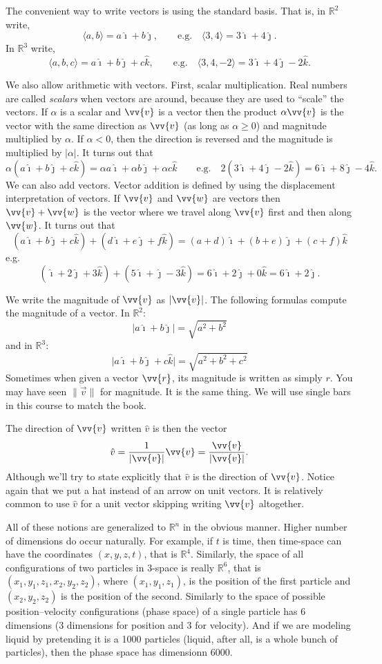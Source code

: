 \documentclass[11pt]{article}
\newcommand{\sabs}[1]{\lvert {#1} \rvert}
\newcommand{\snorm}[1]{\lVert {#1} \rVert}
\newcommand{\R}{{\mathbb{R}}}
\newcommand{\veci}{\hat{\imath}}
\newcommand{\vecj}{\hat{\jmath}}
\newcommand{\veck}{\hat{k}}
\begin{document}
The convenient way to write vectors is using the standard basis.
That is, in $\R^2$ write,
$$
\langle a,b \rangle = a \veci + b \vecj,
\qquad \text{e.g.} \quad
\langle 3,4 \rangle = 3 \veci + 4 \vecj.
$$
In $\R^3$ write,
$$
\langle a,b,c \rangle = a \veci + b \vecj + c \veck,
\qquad \text{e.g.} \quad
\langle 3,4,-2 \rangle = 3 \veci + 4 \vecj - 2 \veck.
$$

We also allow arithmetic with vectors.
First, scalar multiplication.
Real numbers are called \emph{scalars} when vectors are around,
because they are used to ``scale'' the vectors.
If $\alpha$ is a scalar and $\vv{v}$
is a vector then the product $\alpha\vv{v}$ is the vector with the same direction as
$\vv{v}$ (as long as $\alpha \geq 0$) and magnitude multiplied by $\alpha$.
If $\alpha < 0$, then the direction is reversed and the magnitude is multiplied by
$\sabs{\alpha}$.
It turns out that
$$
\alpha ( a \veci + b \vecj + c \veck ) =
\alpha a \veci + \alpha b \vecj + \alpha c \veck
\qquad \text{e.g.} \quad
2 ( 3 \veci + 4 \vecj - 2 \veck ) =
6 \veci + 8 \vecj - 4 \veck
.
$$
We can also add vectors.
Vector addition is defined by using the displacement interpretation of vectors.
If $\vv{v}$ and $\vv{w}$ are vectors
then $\vv{v}+\vv{w}$ is the vector where we travel along $\vv{v}$ first
and then along $\vv{w}$.
It turns out that
$$
( a \veci + b \vecj + c \veck ) +
( d \veci + e \vecj + f \veck ) =
(a+d) \veci + (b+e) \vecj + (c+f) \veck
$$
e.g.
$$
( \veci + 2 \vecj + 3 \veck ) +
( 5 \veci + \vecj - 3 \veck ) =
6 \veci + 2 \vecj + 0 \veck = 6 \veci + 2 \vecj
.
$$

We write the magnitude of $\vv{v}$ as
$\sabs{\vv{v}}$.
The following formulas compute the magnitude of a vector.
In $\R^2$:
$$
\sabs{a \veci + b \vecj}
=
\sqrt{a^2+b^2}
$$
and in $\R^3$:
$$
\sabs{a \veci + b \vecj + c \veck}
=
\sqrt{a^2+b^2+c^2}
$$
Sometimes when given a vector $\vv{r}$, its magnitude is written as simply $r$.
You may have seen $\snorm{\vec{v}}$ for magnitude. 
It is the same thing.
We will use single bars in this course to
match the book.

The direction of $\vv{v}$ written $\hat{v}$ is then
the vector
$$
\hat{v} = \frac{1}{\sabs{\vv{v}}} \vv{v} = \frac{\vv{v}}{\sabs{\vv{v}}} .
$$
Although we'll try to state explicitly that $\hat{v}$  is the direction of $\vv{v}$.
Notice again that we put a hat instead of an arrow on unit vectors.  It is relatively
common to use $\hat{v}$ for a unit vector skipping writing $\vv{v}$ altogether.

All of these notions are generalized to $\R^n$ in the obvious manner.
Higher number of dimensions do occur naturally.
For example, if $t$ is time, then time-space can have the coordinates $(x,y,z,t)$,
that is $\R^4$.  Similarly, the space of all configurations of two particles in 3-space
is really $\R^6$, that is $(x_1,y_1,z_1,x_2,y_2,z_2)$, where
$(x_1,y_1,z_1)$, is the position of the first particle and $(x_2,y_2,z_2)$ is
the position of the second.
Similarly to the space of possible
position--velocity configurations (phase space)
of a single particle has 6 dimensions
(3 dimensions for position and 3 for velocity).
And if we are modeling liquid by pretending it
is a 1000 particles (liquid, after all,
is a whole bunch of particles),
then the phase space has dimensionn 6000.
\end{document}
